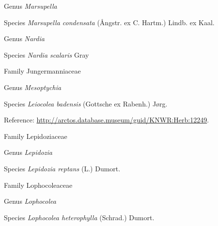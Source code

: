 \documentclass[9pt, article]{memoir}
\begin{document}
\begin{multicols}{2}
\vspace{6pt}\noindent\hspace{30pt}Genus \textit{Marsupella}


\vspace{6pt}\noindent\hspace{36pt}Species \textit{Marsupella condensata} (Ångstr. ex C. Hartm.) Lindb. ex Kaal.


\vspace{6pt}\noindent\hspace{30pt}Genus \textit{Nardia}


\vspace{6pt}\noindent\hspace{36pt}Species \textit{Nardia scalaris} Gray


\vspace{6pt}\noindent\hspace{24pt}Family Jungermanniaceae


\vspace{6pt}\noindent\hspace{30pt}Genus \textit{Mesoptychia}


\vspace{6pt}\noindent\hspace{36pt}Species \textit{Leiocolea badensis} (Gottsche ex Rabenh.) Jørg.


\vspace{6pt}Reference: 
\url{http://arctos.database.museum/guid/KNWR:Herb:12249}.

\vspace{6pt}\noindent\hspace{24pt}Family Lepidoziaceae


\vspace{6pt}\noindent\hspace{30pt}Genus \textit{Lepidozia}


\vspace{6pt}\noindent\hspace{36pt}Species \textit{Lepidozia reptans} (L.) Dumort.


\vspace{6pt}\noindent\hspace{24pt}Family Lophocoleaceae


\vspace{6pt}\noindent\hspace{30pt}Genus \textit{Lophocolea}


\vspace{6pt}\noindent\hspace{36pt}Species \textit{Lophocolea heterophylla} (Schrad.) Dumort.



\end{multicols}
\end{document}
